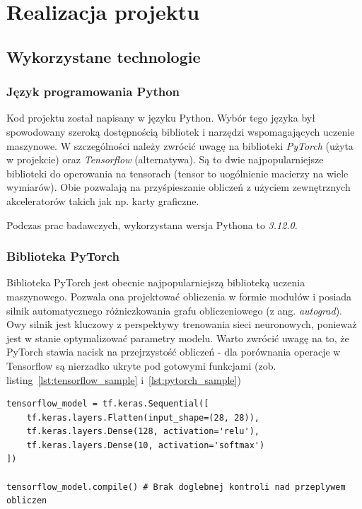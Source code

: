 \chapter{Realizacja projektu}


\section{Wykorzystane technologie}

\subsection{Język programowania Python}

Kod projektu został napisany w języku Python. Wybór tego języka był spowodowany szeroką dostępnością bibliotek i
narzędzi wspomagających uczenie maszynowe. W szczególności należy zwrócić uwagę na biblioteki \textit{PyTorch} (użyta w projekcie) oraz \textit{Tensorflow} (alternatywa).
Są to dwie najpopularniejsze biblioteki do operowania na tensorach (tensor to uogólnienie macierzy na wiele wymiarów).
Obie pozwalają na przyśpieszanie obliczeń z użyciem zewnętrznych akceleratorów takich jak np. karty graficzne.

Podczas prac badawczych, wykorzystana wersja Pythona to \textit{3.12.0}.

\subsection{Biblioteka PyTorch}

Biblioteka PyTorch jest obecnie najpopularniejszą biblioteką uczenia maszynowego.
Pozwala ona projektować obliczenia w formie modułów i posiada silnik automatycznego różniczkowania grafu obliczeniowego (z ang. \textit{autograd}).
Owy silnik jest kluczowy z perspektywy trenowania sieci neuronowych, ponieważ jest w stanie optymalizować parametry modelu.
Warto zwrócić uwagę na to, że PyTorch stawia nacisk na przejrzystość obliczeń - dla porównania operacje w Tensorflow są nierzadko
ukryte pod gotowymi funkcjami (zob. listing~\ref{lst:tensorflow_sample} i~\ref{lst:pytorch_sample})

\begin{lstlisting}[language=ipython,caption={Przykładowa sieć neuronowa w Tensorflow},label={lst:tensorflow_sample}]
tensorflow_model = tf.keras.Sequential([
    tf.keras.layers.Flatten(input_shape=(28, 28)),
    tf.keras.layers.Dense(128, activation='relu'),
    tf.keras.layers.Dense(10, activation='softmax')
])

tensorflow_model.compile() # Brak doglebnej kontroli nad przeplywem obliczen
\end{lstlisting}


